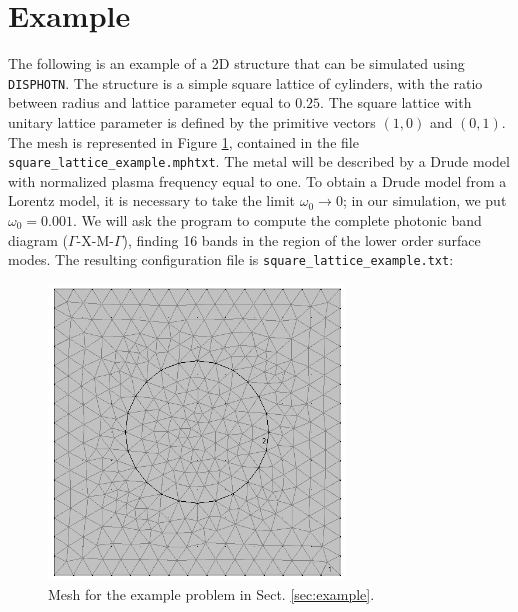 \documentclass[11pt,a4paper,oneside]{article}
\begin{document}
\section{Example\label{sec:example}}
The following is an example of a 2D structure that can be simulated using {\tt DISPHOTN}. The structure is a simple square lattice of cylinders, with the ratio between radius and lattice parameter equal to $0.25$. The square lattice with unitary lattice parameter is defined by the primitive vectors $(1, 0)$ and $(0, 1)$. The mesh is represented in Figure \ref{fig:example_mesh}, contained in the file {\tt square\_lattice\_example.mphtxt}. The metal will be described by a Drude model with normalized plasma frequency equal to one. To obtain a Drude model from a Lorentz model, it is necessary to take the limit $\omega_0 \rightarrow 0$; in our simulation, we put $\omega_0 = 0.001$. We will ask the program to compute the complete photonic band diagram ($\Gamma$-X-M-$\Gamma$), finding 16 bands in the region of the lower order surface modes. The resulting configuration file is {\tt square\_lattice\_example.txt}:
\begin{figure}[t]
\begin{center}
\includegraphics[width=0.7\textwidth]{example.png}
\caption{\label{fig:example_mesh} Mesh for the example problem in Sect. \ref{sec:example}.}
\end{center}
\end{figure}
\end{document}
